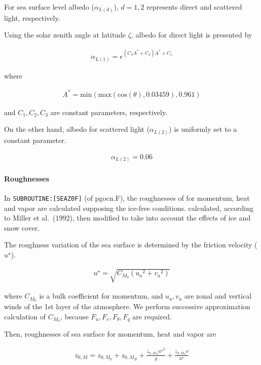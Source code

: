 For sea surface level albedo (\(\alpha_{L(d)}\)), \(d=1,2\) represents
direct and scattered light, respectively.

Using the solar zenith angle at latitude \(\zeta\), albedo for direct
light is presented by

\begin{eqnarray}
    \alpha_{L(1)} = e^{(C_3A^* + C_2) A^* +C_1}
\end{eqnarray}

where

\begin{eqnarray}
    A^* = \mathrm{min}(\mathrm{max}(\mathrm{cos}(\theta),0.03459),0.961)
\end{eqnarray}

and \(C_1,C_2,C_3\) are constant parameters, respectively.

On the other hand, albedo for scattered light (\(\alpha_{L(2)}\)) is
uniformly set to a constant parameter.

\begin{eqnarray}
    \alpha_{L(2)} = 0.06
\end{eqnarray}

\hypertarget{roughnesses}{%
\paragraph{Roughnesses}\label{roughnesses}}

In \texttt{SUBROUTINE:{[}SEAZ0F{]}} (of pgocn.F), the roughnesses of for
momentum, heat and vapor are calculated supposing the ice-free
conditions. calculated, according to Miller et al.~(1992), then modified
to take into account the effects of ice and snow cover.

The roughness variation of the sea surface is determined by the friction
velocity (\(u^\star\)).

\begin{eqnarray}
u^{\star} = \sqrt{C_{M_0} ({u_a}^2  +{v_a}^2)}
\end{eqnarray}

where \(C_{M_0}\) is a bulk coefficient for momentum, and \(u_a,v_a\)
are zonal and vertical winds of the 1st layer of the atmosphere. We
perform successive approximation calculation of \({C_{M_0}}\), because
\(F_u,F_v,F_\theta,F_q\) are required.

Then, roughnesses of sea surface for momentum, heat and vapor are

\begin{eqnarray}
    z_{0,M} = z_{0,M_0} + z_{0,M_R} + \frac{z_{0,M_R} {u^\star }^2 }{g} + \frac{z_{0,M_S}\nu }{u^\star}
\end{eqnarray}

